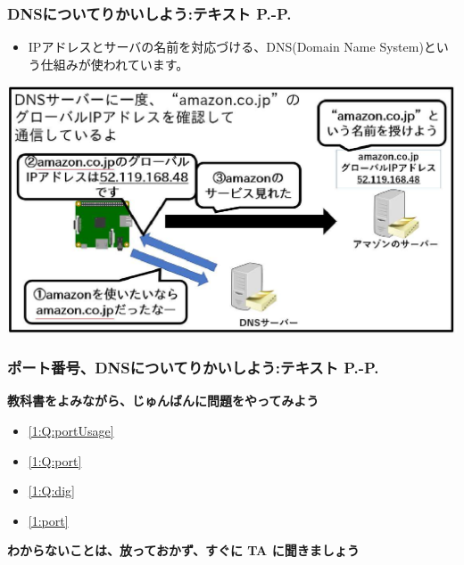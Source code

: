 \documentclass[dvipdfmx]{beamer}
\begin{document}
\begin{frame}[fragile]
	\frametitle{DNSについてりかいしよう:テキスト P.\pageref{1:P:DNS}-P.\pageref{1:P:HTML}~~~}
            \begin{itemize}
                \item IPアドレスとサーバの名前を対応づける、DNS(Domain Name System)という仕組みが使われています。
            \end{itemize}
			\begin{minipage}{\textwidth}
                {\upshape
                  \includegraphics[width=\textwidth]{ome7-img027}}
            \end{minipage}
\end{frame}

\begin{frame}[fragile]
	\frametitle{\large{ポート番号、DNSについてりかいしよう:テキスト P.\pageref{1:P:port}-P.\pageref{1:P:HTML}}~~~}
      \large\textbf{教科書をよみながら、じゅんばんに問題をやってみよう}
				\begin{itemize}
					\item \ref*{1:Q:portUsage}
					\item \ref*{1:Q:port}
					\item \ref*{1:Q:dig}
					\item \ref*{1:port}
				\end{itemize}
      \vfill
      \large\textbf{わからないことは、放っておかず、すぐに TA に聞きましょう}
\end{frame}
\end{document}
